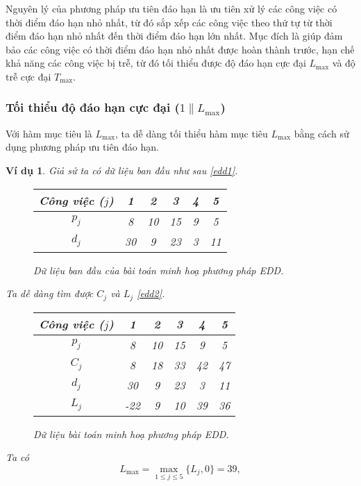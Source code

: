 \documentclass[12pt,a4paper]{report}
\newtheorem{vd}{Ví dụ}
\begin{document}
Nguyên lý của phương pháp ưu tiên đáo hạn là ưu tiên xử lý các công việc có thời điểm đáo hạn nhỏ nhất, từ đó sắp xếp các công việc theo thứ tự từ thời điểm đáo hạn nhỏ nhất đến thời điểm đáo hạn lớn nhất. Mục đích là giúp đảm bảo các công việc có thời điểm đáo hạn nhỏ nhất được hoàn thành trước, hạn chế khả năng các công việc bị trễ, từ đó tối thiểu được độ đáo hạn cực đại $L_{\max}$ và độ trễ cực đại $T_{\max}$.

\subsubsection*{Tối thiểu độ đáo hạn cực đại ($1 \| L_{\max}$)}
Với hàm mục tiêu là $L_{\max}$, ta dễ dàng tối thiểu hàm mục tiêu $L_{\max}$ bằng cách sử dụng phương pháp ưu tiên đáo hạn.

\begin{vd}
Giả sử ta có dữ liệu ban đầu như sau \eqref{edd1}.
\begin{figure}[h!]
\centering
	\begin{tabular}{|c | c c c c c |} 
	\hline
	Công việc ($j$) & 1 & 2 & 3 & 4 & 5 \\
	\hline\hline
	$p_j$ & 8 & 10 & 15 & 9 & 5 \\
	$d_j$ & 30 & 9 & 23 & 3 & 11 \\
	\hline
	\end{tabular}
	\caption{\label{edd1} Dữ liệu ban đầu của bài toán minh hoạ phương pháp EDD.}
\end{figure}

Ta dễ dàng tìm được $C_j$ và $L_j$ \eqref{edd2}.
\begin{figure}[h!]
\centering
	\begin{tabular}{|c | c c c c c |} 
	\hline
	Công việc ($j$) & 1 & 2 & 3 & 4 & 5 \\
	\hline\hline
	$p_j$ & 8 & 10 & 15 & 9 & 5 \\
	$C_j$ & 8 & 18 & 33 & 42 & 47 \\
	$d_j$ & 30 & 9 & 23 & 3 & 11 \\
	$L_j$ & -22 & 9 & 10 & 39 & 36 \\
	\hline
	\end{tabular}
	\caption{\label{edd2} Dữ liệu bài toán minh hoạ phương pháp EDD.}
\end{figure}

Ta có
\begin{equation*}
	L_{\max} = \max _{1 \leq j \leq 5} \{L_j, 0\} = 39,
\end{equation*}


\end{vd}
\end{document}
